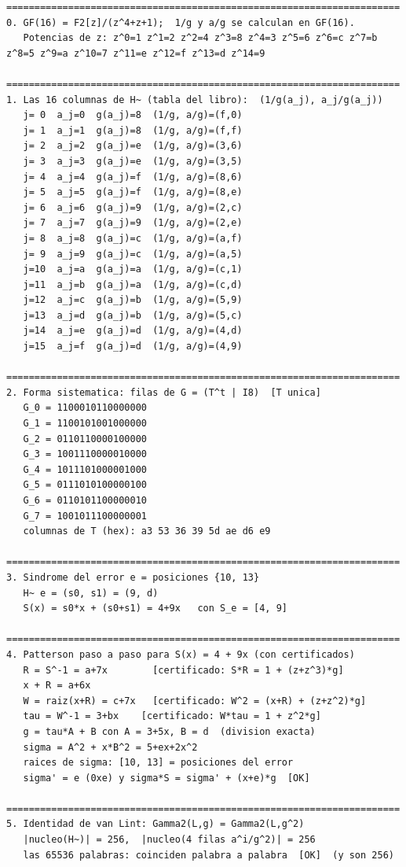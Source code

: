 \begin{lstlisting}[numbers=none]
======================================================================
0. GF(16) = F2[z]/(z^4+z+1);  1/g y a/g se calculan en GF(16).
   Potencias de z: z^0=1 z^1=2 z^2=4 z^3=8 z^4=3 z^5=6 z^6=c z^7=b z^8=5 z^9=a z^10=7 z^11=e z^12=f z^13=d z^14=9

======================================================================
1. Las 16 columnas de H~ (tabla del libro):  (1/g(a_j), a_j/g(a_j))
   j= 0  a_j=0  g(a_j)=8  (1/g, a/g)=(f,0)
   j= 1  a_j=1  g(a_j)=8  (1/g, a/g)=(f,f)
   j= 2  a_j=2  g(a_j)=e  (1/g, a/g)=(3,6)
   j= 3  a_j=3  g(a_j)=e  (1/g, a/g)=(3,5)
   j= 4  a_j=4  g(a_j)=f  (1/g, a/g)=(8,6)
   j= 5  a_j=5  g(a_j)=f  (1/g, a/g)=(8,e)
   j= 6  a_j=6  g(a_j)=9  (1/g, a/g)=(2,c)
   j= 7  a_j=7  g(a_j)=9  (1/g, a/g)=(2,e)
   j= 8  a_j=8  g(a_j)=c  (1/g, a/g)=(a,f)
   j= 9  a_j=9  g(a_j)=c  (1/g, a/g)=(a,5)
   j=10  a_j=a  g(a_j)=a  (1/g, a/g)=(c,1)
   j=11  a_j=b  g(a_j)=a  (1/g, a/g)=(c,d)
   j=12  a_j=c  g(a_j)=b  (1/g, a/g)=(5,9)
   j=13  a_j=d  g(a_j)=b  (1/g, a/g)=(5,c)
   j=14  a_j=e  g(a_j)=d  (1/g, a/g)=(4,d)
   j=15  a_j=f  g(a_j)=d  (1/g, a/g)=(4,9)

======================================================================
2. Forma sistematica: filas de G = (T^t | I8)  [T unica]
   G_0 = 1100010110000000
   G_1 = 1100101001000000
   G_2 = 0110110000100000
   G_3 = 1001110000010000
   G_4 = 1011101000001000
   G_5 = 0111010100000100
   G_6 = 0110101100000010
   G_7 = 1001011100000001
   columnas de T (hex): a3 53 36 39 5d ae d6 e9

======================================================================
3. Sindrome del error e = posiciones {10, 13}
   H~ e = (s0, s1) = (9, d)
   S(x) = s0*x + (s0+s1) = 4+9x   con S_e = [4, 9]

======================================================================
4. Patterson paso a paso para S(x) = 4 + 9x (con certificados)
   R = S^-1 = a+7x        [certificado: S*R = 1 + (z+z^3)*g]
   x + R = a+6x
   W = raiz(x+R) = c+7x   [certificado: W^2 = (x+R) + (z+z^2)*g]
   tau = W^-1 = 3+bx    [certificado: W*tau = 1 + z^2*g]
   g = tau*A + B con A = 3+5x, B = d  (division exacta)
   sigma = A^2 + x*B^2 = 5+ex+2x^2
   raices de sigma: [10, 13] = posiciones del error
   sigma' = e (0xe) y sigma*S = sigma' + (x+e)*g  [OK]

======================================================================
5. Identidad de van Lint: Gamma2(L,g) = Gamma2(L,g^2)
   |nucleo(H~)| = 256,  |nucleo(4 filas a^i/g^2)| = 256
   las 65536 palabras: coinciden palabra a palabra  [OK]  (y son 256)


\end{lstlisting}
